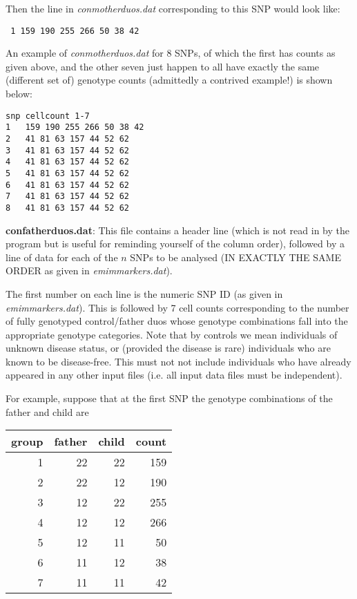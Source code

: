 \documentclass[a4paper,11pt]{report}
\begin{document}
Then the line in	{\it  conmotherduos.dat} corresponding to this SNP 
would look like:

{\tt
1 	159 190 255 266 50 38 42
}

An example of {\it  conmotherduos.dat} for 8 SNPs, of which the first has counts as given above, and the other seven just happen to all have exactly the same (different set of) genotype counts (admittedly a contrived example!) is shown below:

\begin{verbatim}
snp	cellcount 1-7
1 	159 190 255 266 50 38 42
2 	41 81 63 157 44 52 62
3 	41 81 63 157 44 52 62
4 	41 81 63 157 44 52 62
5 	41 81 63 157 44 52 62
6 	41 81 63 157 44 52 62
7 	41 81 63 157 44 52 62
8 	41 81 63 157 44 52 62
\end{verbatim}
 
\bigskip



	{\bf  confatherduos.dat}:  This file contains a header line
(which is not read in by the program but is useful for reminding
yourself of the  column order), followed by a line of data
for each of the $n$ SNPs to be analysed (IN EXACTLY THE SAME ORDER
as given in {\it emimmarkers.dat}).

The first number on each line is the numeric SNP ID (as given in {\it emimmarkers.dat}). This is followed by 7 cell counts corresponding to the number
of fully genotyped control/father duos whose genotype combinations
fall into the appropriate genotype categories. 
Note that by controls we mean individuals of unknown disease status, or
(provided the disease is rare) individuals who are known to
be disease-free.  This must not not include individuals
who have already appeared in any other input files 
(i.e. all input data files must be
independent).



For example, suppose that at the first SNP the genotype combinations of the father and child are

\begin{tabular}{rrrr} 
group    &   father &child   &count \\ \hline
1 &22 &22       &159\\
2 &22 &12       &190\\
3 &12 &22       &255\\
4 &12 &12       &266\\
5 &12 &11 &50\\
6 &11 &12 &38\\
7 &11 &11 &42\\
\end{tabular}
\end{document}
